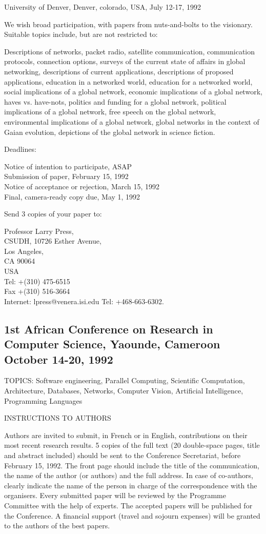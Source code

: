 University of Denver, Denver, colorado, USA, July 12-17, 1992

We wish broad participation, with papers from nuts-and-bolts to
the visionary.  Suitable topics include, but are not restricted
to:

Descriptions of networks, packet radio, satellite communication,
communication protocols, connection options, surveys of the current
state of affairs in global networking, descriptions of current
applications, descriptions of proposed applications, education in a
networked world, education for a networked world, social implications
of a global network, economic implications of a global network, haves
vs. have-nots, politics and funding for a global network, political
implications of a global network, free speech on the global network,
environmental implications of a global network, global networks in the
context of Gaian evolution, depictions of the global network in
science fiction. 

Deadlines:

   Notice of intention to participate, ASAP\\
   Submission of paper, February 15, 1992\\
   Notice of acceptance or rejection, March 15, 1992\\
   Final, camera-ready copy due, May 1, 1992

Send 3 copies of your paper to:

   Professor Larry Press,\\
 CSUDH, 10726 Esther Avenue,\\
Los Angeles,\\ 
CA  90064\\
USA\\
Tel: +(310) 475-6515\\
Fax +(310) 516-3664\\
Internet: lpress@venera.isi.edu
Tel: +468-663-6302.

\subsection{1st African Conference on Research in Computer Science,
Yaounde, Cameroon October 14-20, 1992}

TOPICS: Software engineering,   Parallel Computing, Scientific
Computation, Architecture, Databases, Networks, Computer Vision,
Artificial Intelligence, Programming Languages

INSTRUCTIONS TO AUTHORS

Authors are invited to submit, in French or in English, contributions on
their most recent research results.
5 copies of the full text (20 double-space pages, title and abstract
included) should be sent to the Conference Secretariat, before
February 15, 1992. The front page should include the title of the
communication, the name of the author (or authors) and the full address.
In case of co-authors, clearly indicate the name of the person in charge
of the correspondence with the organisers.
Every submitted paper will be reviewed by the Programme Committee with the
help of experts. The accepted papers will be published for the Conference.
A financial support (travel and sojourn expenses) will be granted to the
authors of the best papers.


